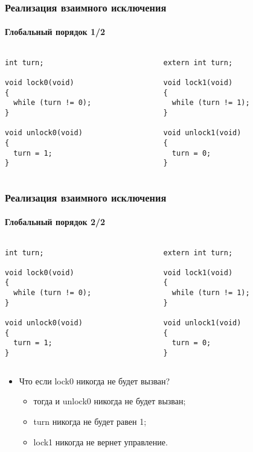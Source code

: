 \begin{frame}[fragile]
\frametitle{Реализация взаимного исключения}
\framesubtitle{Глобальный порядок 1/2}
\begin{columns}
  \begin{column}{.45\linewidth}
    \begin{lstlisting}
int turn;

void lock0(void)
{
  while (turn != 0);
}

void unlock0(void)
{
  turn = 1;
}
    \end{lstlisting}
  \end{column}
  \begin{column}{.45\linewidth}
    \begin{lstlisting}
extern int turn;

void lock1(void)
{
  while (turn != 1);
}

void unlock1(void)
{
  turn = 0;
}
    \end{lstlisting}
  \end{column}
\end{columns}
\end{frame}

\begin{frame}[fragile]
\frametitle{Реализация взаимного исключения}
\framesubtitle{Глобальный порядок 2/2}
\begin{columns}
  \begin{column}{.45\linewidth}
    \begin{lstlisting}
int turn;

void lock0(void)
{
  while (turn != 0);
}

void unlock0(void)
{
  turn = 1;
}
    \end{lstlisting}
  \end{column}
  \begin{column}{.45\linewidth}
    \begin{lstlisting}
extern int turn;

void lock1(void)
{
  while (turn != 1);
}

void unlock1(void)
{
  turn = 0;
}
    \end{lstlisting}
  \end{column}
\end{columns}
\begin{itemize}
  \item Что если lock0 никогда не будет вызван?
  \begin{itemize}
    \item тогда и unlock0 никогда не будет вызван;
    \item turn никогда не будет равен 1;
    \item lock1 никогда не вернет управление.
  \end{itemize}
\end{itemize}
\end{frame}

